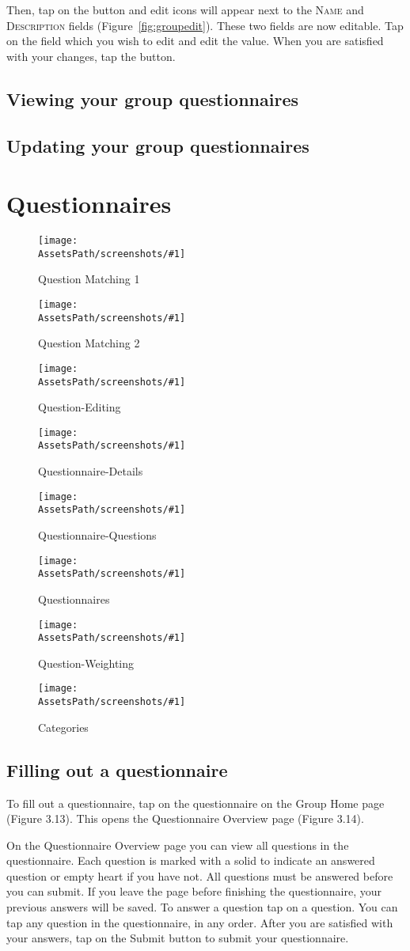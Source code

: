 \documentclass[a4paper,11pt,titlepage]{scrartcl}
\newcommand{\textvar}[1]{{\textsc{#1}}}
\newcommand{\textaction}[1]{{\fontfamily{cmtt}\selectfont#1}}
\newcommand{\action}[1]{\textaction{#1}}
\newcommand*{\fileMatchingTypeOne}{question-matching-1}
\newcommand*{\fileMatchingTypeTwo}{question-matching-2}
\newcommand*{\fileQuestion}{question-editing}
\newcommand*{\fileQuestionnaire}{questionnaire-details}
\newcommand*{\fileQuestions}{questionnaire-questions}
\newcommand*{\fileQuestionnaires}{questionnaires}
\newcommand*{\fileWeighting}{question-weighting}
\newcommand*{\fileCategories}{categories}
\newcommand*{\AssetsPath}{../assets}%
\newcommand{\appscreenshot}[3]{
	\begin{figure}[ht!]%
	\label{#3}%
	\texttt{[image: \\AssetsPath/screenshots/\#1]}%
	\centering%
	\caption{#2}%
	\end{figure}%
}
\begin{document}
Then, \action{tap} on the  button and edit icons will appear next to the \textvar{Name} and \textvar{Description} fields (Figure~\ref{fig:groupedit}). These two fields are now editable. \action{Tap} on the field which you wish to edit and edit the value.  When you are satisfied with your changes, \action{tap} the  button.

\subsection{Viewing your group questionnaires}
\label{sec:group-questionnaire}

\subsection{Updating your group questionnaires}
\label{sec:group-questionnaire-edit}

\clearpage
\section{Questionnaires}
\label{sec:questionnaires}
\appscreenshot{\fileMatchingTypeOne}{Question Matching 1}{fig:questionmatch1}
\appscreenshot{\fileMatchingTypeTwo}{Question Matching 2}{fig:questionmatch2}
\appscreenshot{\fileQuestion}{Question-Editing}{fig:questionedit}
\appscreenshot{\fileQuestionnaire}{Questionnaire-Details}{fig:questiondetails}
\appscreenshot{\fileQuestions}{Questionnaire-Questions}{fig:questions}
\appscreenshot{\fileQuestionnaires}{Questionnaires}{fig:questionnaires}
\appscreenshot{\fileWeighting}{Question-Weighting}{fig:weighting}
\appscreenshot{\fileCategories}{Categories}{fig:categories}
\subsection{Filling out a questionnaire}
\label{sec:questionnaire-fill}
To fill out a questionnaire, tap on the questionnaire on the Group Home page (Figure 3.13). This opens the Questionnaire Overview page (Figure 3.14). 

On the Questionnaire Overview page you can view all questions in the questionnaire.  Each question is marked with a solid   to indicate an answered question or empty heart   if you have not.  All questions must be answered before you can submit.  If you leave the page before finishing the questionnaire, your previous answers will be saved. To answer a question tap on a question.  You can tap any question in the questionnaire, in any order.  After you are satisfied with your answers, tap on the Submit button to submit your questionnaire.  
\end{document}
